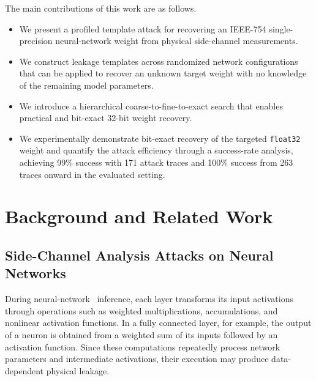 \documentclass[conference]{IEEEtran}
\begin{document}
The main contributions of this work are as follows.
\begin{itemize}
	\vspace{-0.2cm}
	\item We present a profiled template attack for recovering an IEEE-754 single-precision neural-network weight from physical side-channel measurements.
	\item We construct leakage templates across randomized network configurations that can be applied to recover an unknown target weight with no knowledge of the remaining model parameters.
	\item We introduce a hierarchical coarse-to-fine-to-exact search that enables practical and bit-exact 32-bit weight recovery.
	\item We experimentally demonstrate bit-exact recovery of the targeted \texttt{float32} weight and quantify the attack efficiency through a success-rate analysis, achieving 99\% success with 171 attack traces and 100\% success from 263 traces onward in the evaluated setting.
\end{itemize}



\section{Background and Related Work}
\label{sec:background}

\subsection{Side-Channel Analysis Attacks on Neural Networks}
\label{sec:scaonnn}
During neural-network~\cite{goodfellow2016deep} inference, each layer transforms its input activations through operations such as weighted multiplications, accumulations, and nonlinear activation functions.
In a fully connected layer, for example, the output of a neuron is obtained from a weighted sum of its inputs followed by an activation function.
Since these computations repeatedly process network parameters and intermediate activations, their execution may produce data-dependent physical leakage.
\end{document}
